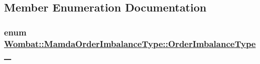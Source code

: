\subsection{Member Enumeration Documentation}
\hypertarget{classWombat_1_1MamdaOrderImbalanceType_1d6586915356b2aa4c6931591f172c14}{
\subsubsection[OrderImbalanceType\_\-]{\setlength{\rightskip}{0pt plus 5cm}enum \hyperlink{classWombat_1_1MamdaOrderImbalanceType_1d6586915356b2aa4c6931591f172c14}{Wombat::Mamda\-Order\-Imbalance\-Type::Order\-Imbalance\-Type\_\-}}}
\label{classWombat_1_1MamdaOrderImbalanceType_1d6586915356b2aa4c6931591f172c14}


